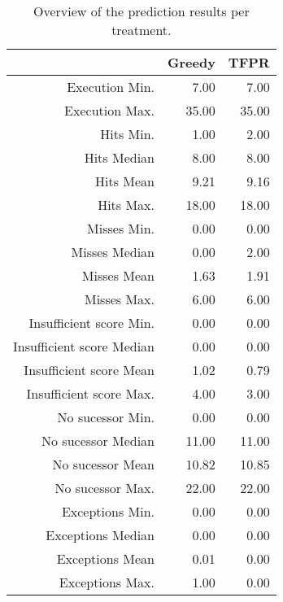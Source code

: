 \begin{table}[ht]
\centering
\begin{tabular}{rrr}
  \hline
 & Greedy & TFPR \\ 
  \hline
Execution Min. & 7.00 & 7.00 \\ 
  Execution Max. & 35.00 & 35.00 \\ 
  Hits Min. & 1.00 & 2.00 \\ 
  Hits Median & 8.00 & 8.00 \\ 
  Hits Mean & 9.21 & 9.16 \\ 
  Hits Max. & 18.00 & 18.00 \\ 
  Misses Min. & 0.00 & 0.00 \\ 
  Misses Median & 0.00 & 2.00 \\ 
  Misses Mean & 1.63 & 1.91 \\ 
  Misses Max. & 6.00 & 6.00 \\ 
  Insufficient score Min. & 0.00 & 0.00 \\ 
  Insufficient score Median & 0.00 & 0.00 \\ 
  Insufficient score Mean & 1.02 & 0.79 \\ 
  Insufficient score Max. & 4.00 & 3.00 \\ 
  No sucessor Min. & 0.00 & 0.00 \\ 
  No sucessor Median & 11.00 & 11.00 \\ 
  No sucessor Mean & 10.82 & 10.85 \\ 
  No sucessor Max. & 22.00 & 22.00 \\ 
  Exceptions Min. & 0.00 & 0.00 \\ 
  Exceptions Median & 0.00 & 0.00 \\ 
  Exceptions Mean & 0.01 & 0.00 \\ 
  Exceptions Max. & 1.00 & 0.00 \\ 
   \hline
\end{tabular}
\caption{Overview of the prediction results per treatment.} 
\label{tab:results:rq4:summary:treatment:counts}
\end{table}

